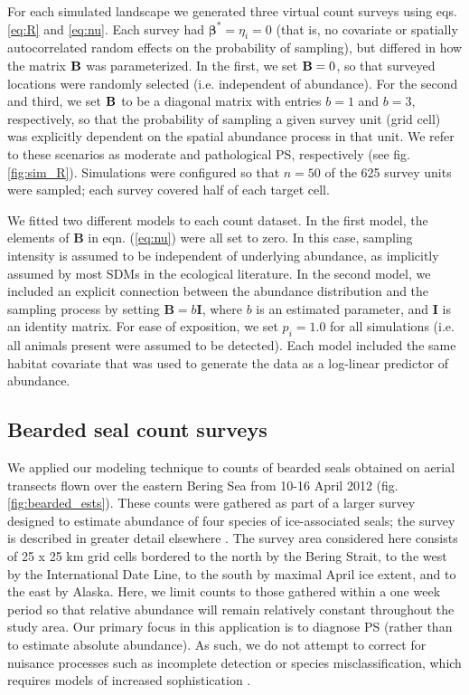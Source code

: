 \documentclass[times,mee,doublespace,]{besauth2}
\begin{document}
For each simulated landscape we generated three virtual count surveys using eqs. \ref{eq:R} and \ref{eq:nu}.  Each survey had $\boldsymbol{\beta}^*=\eta_i=0$ (that is, no covariate or spatially autocorrelated random effects on the probability of sampling), but differed in how the matrix ${\bf B}$ was parameterized.  In the first, we set ${\bf B}=0$, so that surveyed locations were randomly selected (i.e. independent of abundance).  For the second and third, we set ${\bf B}$ to be a diagonal matrix with entries $b=1$ and $b=3$, respectively, so that the probability of sampling a given survey unit (grid cell) was explicitly dependent on the spatial abundance process in that unit.  We refer to these scenarios as moderate and pathological PS, respectively (see fig. \ref{fig:sim_R}).  Simulations were configured so that $n=50$ of the 625 survey units were sampled; each survey covered half of each target cell.

We fitted two different models to each count dataset. In the first model, the elements of \textbf{B} in eqn. (\ref{eq:nu}) were all set to zero.  In this case, sampling intensity is assumed to be independent of underlying abundance, as implicitly assumed by most SDMs in the ecological literature.  In the second model, we included an explicit connection between the abundance distribution and the sampling process by setting $\textbf{B}=b\textbf{I}$, where $b$ is an estimated parameter, and \textbf{I} is an identity matrix. For ease of exposition, we set $p_i = 1.0$ for all simulations (i.e. all animals present were assumed to be detected).  Each model included the same habitat covariate that was used to generate the data as a log-linear predictor of abundance.


\subsection{Bearded seal count surveys}

We applied our modeling technique to counts of bearded seals obtained on aerial transects flown over the eastern Bering Sea from 10-16 April 2012 (fig. \ref{fig:bearded_ests}). These counts were gathered as part of a larger survey designed to estimate abundance of four species of ice-associated seals; the survey is described in greater detail elsewhere \citep{ConnEtAl2014,ConnEtAl2015}. The survey area considered here consists of 25 x 25 km grid cells bordered to the north by the Bering Strait, to the west by the International Date Line, to the south by maximal April ice extent, and to the east by Alaska. Here, we limit counts to those gathered within a one week period so that relative abundance will remain relatively constant throughout the study area.  Our primary focus in this application is to diagnose PS (rather than to estimate absolute abundance).  As such, we do not attempt to correct for nuisance processes such as incomplete detection or species misclassification, which requires models of increased sophistication \citep{ConnEtAl2014}.
\end{document}
